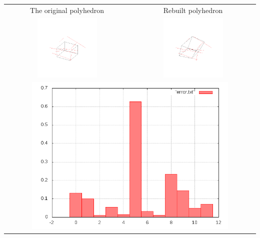 \documentclass[11pt,fleqn,a4paper]{scrartcl}
\begin{document}
\begin{center}

\begin{tabular}{|c|c|}
\hline
The original polyhedron& Rebuilt polyhedron \\
\includegraphics[width=0.5\textwidth]{variant2/images/14/input.png} &
\includegraphics[width=0.5\textwidth]{variant2/images/14/out.png} \\
\midrule
\multicolumn{2}{|c|}{ \includegraphics[width=0.8\textwidth]{variant2/images/14/error.png}} \\
\hline
\end{tabular}
\end{center}
\end{document}
